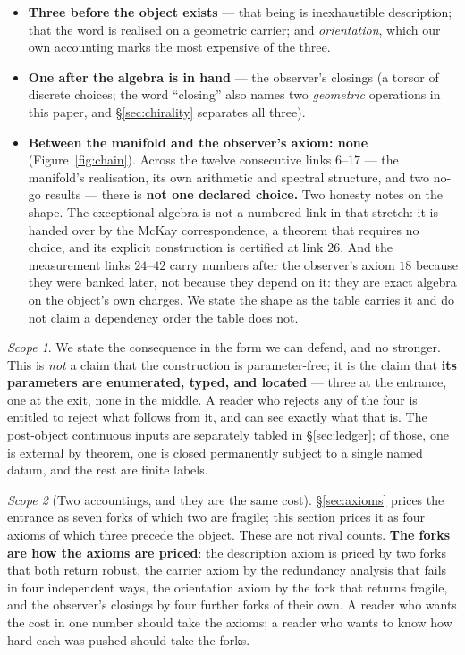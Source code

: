\documentclass[11pt,a4paper]{article}
\theoremstyle{definition}
\theoremstyle{remark}
\newtheorem{scopenote}{Scope}
\begin{document}
\begin{itemize}
\item \textbf{Three before the object exists} --- that being is inexhaustible description; that the
word is realised on a geometric carrier; and \emph{orientation}, which our own accounting marks the
most expensive of the three.
\item \textbf{One after the algebra is in hand} --- the observer's closings (a torsor of discrete choices; the
word ``closing'' also names two \emph{geometric} operations in this paper, and \S\ref{sec:chirality} separates all three).
\item \textbf{Between the manifold and the observer's axiom: none} (Figure~\ref{fig:chain}). Across the twelve consecutive
links $6$--$17$ --- the manifold's realisation, its own arithmetic and spectral structure, and two no-go results --- there is
\textbf{not one declared choice.} Two honesty notes on the shape. The exceptional algebra is not a numbered link in that
stretch: it is handed over by the McKay correspondence, a theorem that requires no choice, and its explicit construction is
certified at link $26$. And the measurement links $24$--$42$ carry numbers after the observer's axiom $18$ because they were
banked later, not because they depend on it: they are exact algebra on the object's own charges. We state the shape as the
table carries it and do not claim a dependency order the table does not.
\end{itemize}

\begin{scopenote}
We state the consequence in the form we can defend, and no stronger. This is \emph{not} a claim that
the construction is parameter-free; it is the claim that \textbf{its parameters are enumerated,
typed, and located} --- three at the entrance, one at the exit, none in the middle. A reader who
rejects any of the four is entitled to reject what follows from it, and can see exactly what that is.
The post-object continuous inputs are separately tabled in \S\ref{sec:ledger}; of those, one is
external by theorem, one is closed permanently subject to a single named datum, and the rest are
finite labels.
\end{scopenote}

\begin{scopenote}[Two accountings, and they are the same cost]
\S\ref{sec:axioms} prices the entrance as seven forks of which two are fragile; this section prices
it as four axioms of which three precede the object. These are not rival counts. \textbf{The forks
are how the axioms are priced}: the description axiom is priced by two forks that both return
robust, the carrier axiom by the redundancy analysis that fails in four independent ways, the
orientation axiom by the fork that returns fragile, and the observer's closings by four further
forks of their own. A reader who wants the cost in one number should take the axioms; a reader who
wants to know how hard each was pushed should take the forks.
\end{scopenote}
\end{document}
